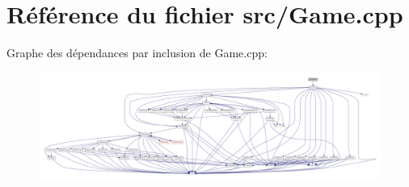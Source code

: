 \section{Référence du fichier src/\-Game.cpp}
\label{_game_8cpp}
Graphe des dépendances par inclusion de Game.\-cpp\-:
\nopagebreak
\begin{figure}[H]
\begin{center}
\leavevmode
\includegraphics[width=350pt]{_game_8cpp__incl}
\end{center}
\end{figure}
